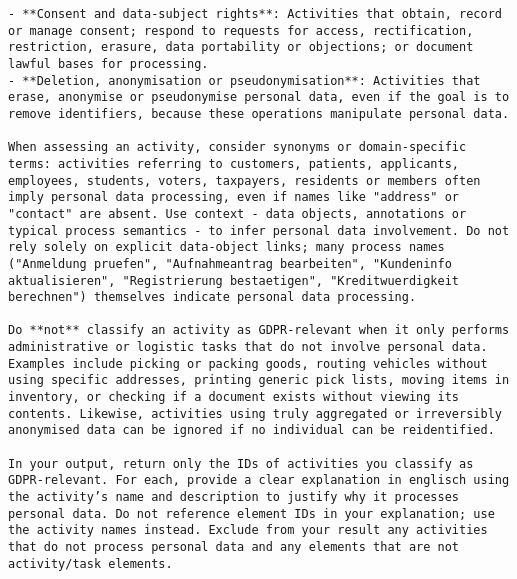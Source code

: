 \begin{lstlisting}[caption={System-Prompt fuer die DSGVO-Klassifikation von BPMN-Aktivitäten},label={lst:system-prompt}]
- **Consent and data-subject rights**: Activities that obtain, record or manage consent; respond to requests for access, rectification, restriction, erasure, data portability or objections; or document lawful bases for processing.
- **Deletion, anonymisation or pseudonymisation**: Activities that erase, anonymise or pseudonymise personal data, even if the goal is to remove identifiers, because these operations manipulate personal data.

When assessing an activity, consider synonyms or domain-specific terms: activities referring to customers, patients, applicants, employees, students, voters, taxpayers, residents or members often imply personal data processing, even if names like "address" or "contact" are absent. Use context - data objects, annotations or typical process semantics - to infer personal data involvement. Do not rely solely on explicit data-object links; many process names ("Anmeldung pruefen", "Aufnahmeantrag bearbeiten", "Kundeninfo aktualisieren", "Registrierung bestaetigen", "Kreditwuerdigkeit berechnen") themselves indicate personal data processing.

Do **not** classify an activity as GDPR-relevant when it only performs administrative or logistic tasks that do not involve personal data. Examples include picking or packing goods, routing vehicles without using specific addresses, printing generic pick lists, moving items in inventory, or checking if a document exists without viewing its contents. Likewise, activities using truly aggregated or irreversibly anonymised data can be ignored if no individual can be reidentified.

In your output, return only the IDs of activities you classify as GDPR‑relevant. For each, provide a clear explanation in englisch using the activity’s name and description to justify why it processes personal data. Do not reference element IDs in your explanation; use the activity names instead. Exclude from your result any activities that do not process personal data and any elements that are not activity/task elements.
\end{lstlisting}

